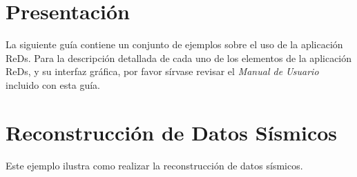 \documentclass[12pt,twoside,letter]{ol-softwaremanual}
\begin{document}
\newpage\null\thispagestyle{empty}\newpage

\clearpage
\tableofcontents

\clearpage

\newpage\null\thispagestyle{empty}\newpage

\section*{Presentación}\label{presentacion}


La siguiente guía contiene un conjunto de ejemplos sobre el uso de la aplicación ReDs. Para la descripción detallada de cada uno de los elementos de la aplicación ReDs, y su interfaz gráfica, por favor sírvase revisar el \textit{Manual de Usuario} incluido con esta guía.

\section{Reconstrucción de Datos Sísmicos}

Este ejemplo ilustra como realizar la reconstrucción de datos sísmicos.
\end{document}
